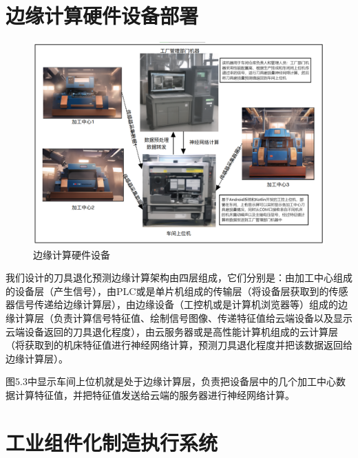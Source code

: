 \section{边缘计算硬件设备部署}
\begin{figure}[htp]
    \centering
    \includegraphics[width=14cm]{Chapter5/network.png}
    \caption{边缘计算硬件设备}
\end{figure}
我们设计的刀具退化预测边缘计算架构由四层组成，它们分别是：由加工中心组成的设备层（产生信号），由PLC或是单片机组成的传输层（将设备层获取到的传感器信号传递给边缘计算层），由边缘设备（工控机或是计算机浏览器等）组成的边缘计算层（负责计算信号特征值、绘制信号图像、传递特征值给云端设备以及显示云端设备返回的刀具退化程度），由云服务器或是高性能计算机组成的云计算层（将获取到的机床特征值进行神经网络计算，预测刀具退化程度并把该数据返回给边缘计算层）。\par
图5.3中显示车间上位机就是处于边缘计算层，负责把设备层中的几个加工中心数据计算特征值，并把特征值发送给云端的服务器进行神经网络计算。\par
% 
\newpage
\section{工业组件化制造执行系统}
% 
